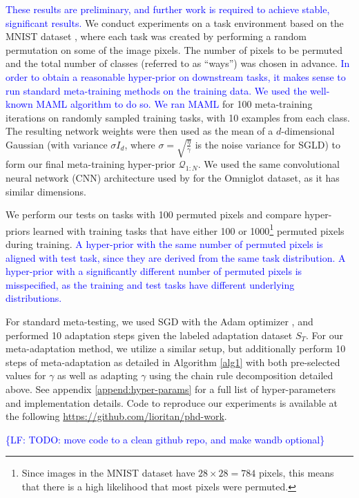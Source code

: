 \documentclass{article}
\theoremstyle{definition}
\newcommand{\LF}[1]{\textcolor{blue}{\{LF: #1\}}}
\newcommand{\LFe}[1]{\textcolor{blue}{#1}}
\begin{document}
\LFe{These results are preliminary, and further work is required to achieve stable, significant results.} We conduct experiments on a task environment based on the MNIST dataset \citep{LeCun1998}, where each task was created by performing a random permutation on some of the image pixels. The number of pixels to be permuted and the total number of classes (referred to as ``ways'') was chosen in advance. \LFe{In order to obtain a reasonable hyper-prior on downstream tasks, it makes sense to run standard meta-training methods on the training data.
We used the well-known MAML \citep{Finn2017}  algorithm to do so. We ran MAML} for 100 meta-training iterations on randomly sampled training tasks, with 10 examples from each class. The resulting network weights were then used as the mean of a $d$-dimensional Gaussian (with variance $\sigma I_d$, where $\sigma=\sqrt{\frac{\eta}{\gamma}}$ is the noise variance for SGLD) to form our final meta-training hyper-prior $\mathcal{Q}_{1:N}$. We used the same convolutional neural network (CNN) architecture used by \citet{Vinyals2016} for the Omniglot dataset, as it has similar dimensions. 

We perform our tests on tasks with 100 permuted pixels and compare hyper-priors learned with training tasks that have either 100 or 1000\footnote{Since images in the MNIST dataset have $28\times 28=784$ pixels, this means that there is a high likelihood that most pixels were permuted.} permuted pixels during training. 
\LFe{A hyper-prior with the same number of permuted pixels is aligned with test task, since they are derived from the same task distribution. A hyper-prior with a significantly different number of permuted pixels is misspecified, as the training and test tasks have different underlying distributions.}

For standard meta-testing, we used SGD with the Adam optimizer \citep{Kingma2015}, and performed 10 adaptation steps given the labeled adaptation dataset $S_T$. For our meta-adaptation method, we utilize a similar setup, but additionally perform 10 steps of meta-adaptation as detailed in Algorithm \ref{alg1} with both pre-selected values for $\gamma$ as well as adapting $\gamma$ using the chain rule decomposition detailed above. See appendix \ref{append:hyper-params} for a full list of hyper-parameters and implementation details. Code to reproduce our experiments is available at the following \hyperlink{Github repository}{https://github.com/lioritan/phd-work}.

\LF{TODO: move code to a clean github repo, and make wandb optional}
\end{document}
